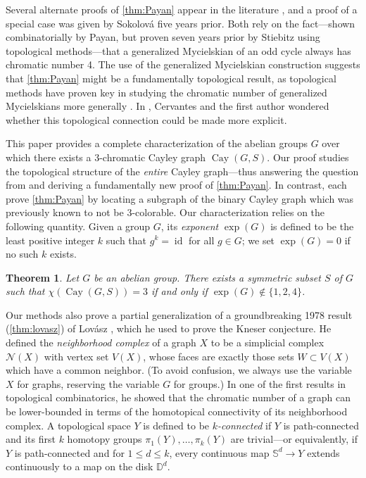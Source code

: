 \documentclass[12pt,letterpaper]{amsart}
\newtheorem{theorem}{Theorem}[section]
\theoremstyle{definition}
\theoremstyle{remark}
\newcommand{\N}{{\mathcal N}}
\DeclareMathOperator{\id}{id}
\DeclareMathOperator{\Cay}{Cay}
\begin{document}
Several alternate proofs of \cref{thm:Payan} appear in the literature \cite{Bea, Cer}, and a proof of a special case was given by Sokolov\'a \cite{Sok} five years prior. Both \cite{Pay,Bea} rely on the fact---shown combinatorially by Payan, but proven seven years prior by Stiebitz \cite{Sti} using topological methods---that a generalized Mycielskian of an odd cycle always has chromatic number 4. The use of the generalized Mycielskian construction suggests that \cref{thm:Payan} might be a fundamentally topological result, as topological methods have proven key in studying the chromatic number of generalized Mycielskians more generally \cite{GyJeSt,Mul}. In \cite{Cer}, Cervantes and the first author wondered whether this topological connection could be made more explicit. 

This paper provides a complete characterization of the abelian groups $G$ over which there exists a 3-chromatic Cayley graph $\Cay(G,S)$. 
Our proof studies the topological structure of the \emph{entire} Cayley graph---thus answering the question from \cite{Cer} and deriving a fundamentally new proof of \cref{thm:Payan}. In contrast, \cite{Bea,Cer,Pay} each prove \cref{thm:Payan} by locating a subgraph of the binary Cayley graph which was previously known to not be 3-colorable.
Our characterization relies on the following quantity. 
Given a group $G$, its \emph{exponent} $\exp(G)$ is defined to be the least positive integer $k$ such that $g^k=\id$ for all $g\in G$; we set $\exp(G)=0$ if no such $k$ exists. 

\begin{theorem}\label{thm:chi3iff}
    Let $G$ be an abelian group. There exists a symmetric subset $S$ of $G$ such that $\chi(\Cay(G,S))=3$ if and only if $\exp(G)\notin\{1,2,4\}$.
\end{theorem}

Our methods also prove a partial generalization of a groundbreaking 1978 result (\cref{thm:lovasz}) of Lov\'asz \cite{Lov}, which he used to prove the Kneser conjecture. He defined the \emph{neighborhood complex} of a graph $X$ to be a simplicial complex $\N(X)$ with vertex set $V(X)$, whose faces are exactly those sets $W\subset V(X)$ which have a common neighbor. (To avoid confusion, we always use the variable $X$ for graphs, reserving the variable $G$ for groups.) In one of the first results in topological combinatorics, he showed that the chromatic number of a graph can be lower-bounded in terms of the homotopical connectivity of its neighborhood complex. A topological space $Y$ is defined to be \emph{$k$-connected} if $Y$ is path-connected and its first $k$ homotopy groups $\pi_1(Y),\ldots,\pi_k(Y)$ are trivial---or equivalently, if $Y$ is path-connected and for $1\leq d\leq k$, every continuous map $\mathbb S^d\to Y$ extends continuously to a map on the disk $\mathbb D^d$.
\end{document}
